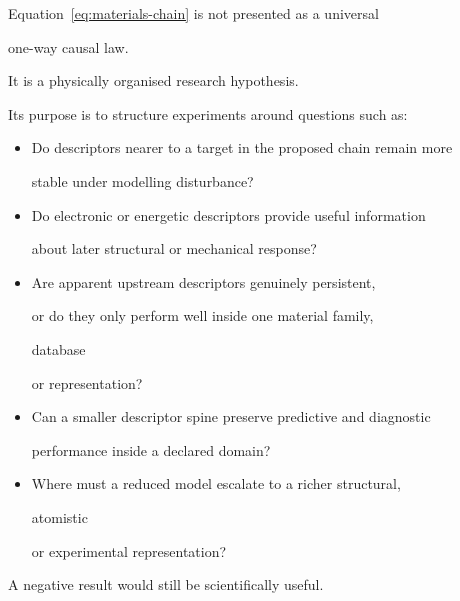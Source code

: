 \documentclass[11pt,a4paper,oneside]{report}
\begin{document}
Equation~\ref{eq:materials-chain} is not presented as a universal

one-way causal law.



It is a physically organised research hypothesis.



Its purpose is to structure experiments around questions such as:



\begin{itemize}



\item

Do descriptors nearer to a target in the proposed chain remain more

stable under modelling disturbance?



\item

Do electronic or energetic descriptors provide useful information

about later structural or mechanical response?



\item

Are apparent upstream descriptors genuinely persistent,

or do they only perform well inside one material family,

database

or representation?



\item

Can a smaller descriptor spine preserve predictive and diagnostic

performance inside a declared domain?



\item

Where must a reduced model escalate to a richer structural,

atomistic

or experimental representation?



\end{itemize}



A negative result would still be scientifically useful.
\end{document}
